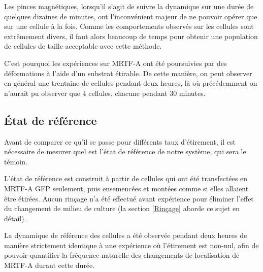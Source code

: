 \documentclass{report}
\begin{document}
Les pinces magnétiques, lorsqu'il s'agit de suivre la dynamique sur une durée de quelques dizaines de minutes, ont l'inconvénient majeur de ne pouvoir opérer que sur une cellule à la fois. Comme les comportements observés sur les cellules sont extrêmement divers, il faut alors beaucoup de temps pour obtenir une population de cellules de taille acceptable avec cette méthode. 

C'est pourquoi les expériences sur MRTF-A ont été poursuivies par des déformations à l'aide d'un substrat étirable. De cette manière, on peut observer en général une trentaine de cellules pendant deux heures, là où précédemment on n'aurait pu observer que 4 cellules, chacune pendant 30 minutes. 



\subsection{\'Etat de référence}

Avant de comparer ce qu'il se passe pour différents taux d'étirement, il est nécessaire de mesurer quel est l'état de référence de notre système, qui sera le témoin. 

L'état de référence est construit à partir de cellules qui ont été transfectées en MRTF-A GFP seulement, puis ensemencées et montées comme si elles allaient être étirées. 
Aucun rinçage n'a été effectué avant expérience pour éliminer l'effet du changement de milieu de culture (la section \ref{Rinçage} aborde ce sujet en détail). 

La dynamique de référence des cellules a été observée pendant deux heures de manière strictement identique à une expérience où l'étirement est non-nul, afin de pouvoir quantifier la fréquence naturelle des changements de localisation de MRTF-A durant cette durée. 
\end{document}
